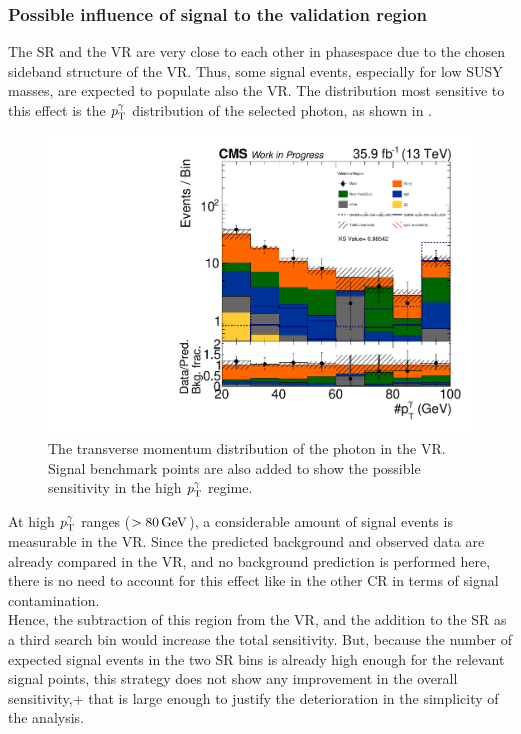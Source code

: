 \subsubsection*{Possible influence of signal to the validation region}
The SR and the VR are very close to each other in phasespace due to the chosen sideband structure of the VR. Thus, some signal events, especially for low SUSY masses, are expected to populate also the VR. The distribution most sensitive to this effect is the $p_{\mathrm{T}}^{\gamma}$ distribution of the selected photon, as shown in .
\begin{figure}[tbp]
 \centering
 \includegraphics[width=\pairwidth]{figures/VR_signal_study/VR_LL_pt_g1_log}
 \caption{The transverse momentum distribution of the photon in the VR. Signal benchmark points are also added to show the possible sensitivity in the high $p_{\mathrm{T}}^{\gamma}$ regime.}
 \label{fig:signalContVR}
\end{figure}
At high $p_{\mathrm{T}}^{\gamma}$ ranges ($>80\,\text{Ge\hspace{-.08em}V}$), a considerable amount of signal events is measurable in the VR. Since the predicted background and observed data are already compared in the VR, and no background prediction is performed here, there is no need to account for this effect like in the other CR in terms of signal contamination.\\
Hence, the subtraction of this region from the VR, and the addition to the SR as a third search bin would increase the total sensitivity. But, because the number of expected signal events in the two SR bins is  already high enough for the relevant signal points, this strategy does not show any improvement in the overall sensitivity,+ that is large enough to justify the deterioration in the simplicity of the analysis.

